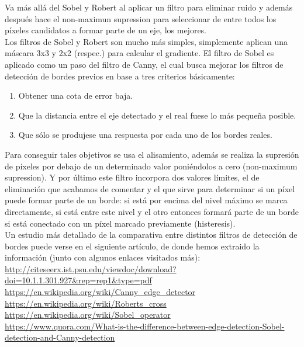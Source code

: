 \documentclass[10pt,a4paper]{article}
\begin{document}
Va más allá del Sobel y Robert al aplicar un filtro para eliminar ruido y además después hace el non-maximun supression para seleccionar de entre todos los píxeles candidatos a formar parte de un eje, los mejores.\\

Los filtros de Sobel y Robert son mucho más simples, simplemente aplican una máscara 3x3 y 2x2 (respec.) para calcular el gradiente. El filtro de Sobel es aplicado como un paso del filtro de Canny, el cual busca mejorar los filtros de detección de bordes previos en base a tres criterios básicamente:

\begin{enumerate}
\item Obtener una cota de error baja.
\item Que la distancia entre el eje detectado y el real fuese lo más pequeña posible.
\item Que sólo se produjese una respuesta por cada uno de los bordes reales.
\end{enumerate}

Para conseguir tales objetivos se usa el alisamiento, además se realiza la supresión de píxeles por debajo de un determinado valor poniéndolos a cero (non-maximum supression). Y por último este filtro incorpora dos valores límites, el de eliminación que acabamos de comentar y el que sirve para determinar si un píxel puede formar parte de un borde: si está por encima del nivel máximo se marca directamente, si está entre este nivel y el otro entonces formará parte de un borde si está conectado con un píxel marcado previamente (histeresis).\\

Un estudio más detallado de la comparativa entre distintos filtros de detección de bordes puede verse en el siguiente artículo, de donde hemos extraido la información (junto con algunos enlaces visitados más):\\

\url{http://citeseerx.ist.psu.edu/viewdoc/download?doi=10.1.1.301.927&rep=rep1&type=pdf}\\

\url{https://en.wikipedia.org/wiki/Canny_edge_detector}\\
\url{https://en.wikipedia.org/wiki/Roberts_cross}\\
\url{https://en.wikipedia.org/wiki/Sobel_operator}\\
\url{https://www.quora.com/What-is-the-difference-between-edge-detection-Sobel-detection-and-Canny-detection}\\
\end{document}
